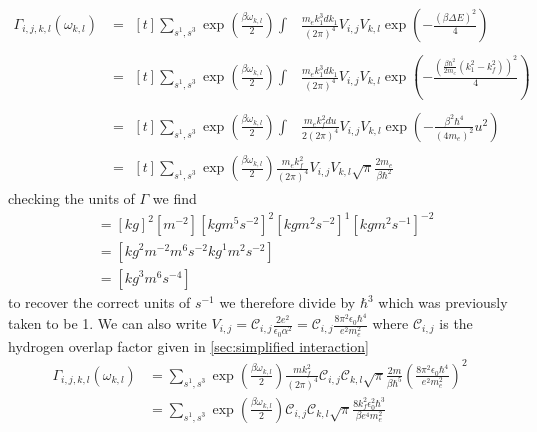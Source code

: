 \begin{align}
    \Gamma_{i,j, k,l}(\omega_{k,l}) & =\begin{aligned}[t]
        \sum_{s^1,s^3} \exp{(\frac{\beta \omega_{k,l}}{2})} \int &
        \frac{m_e k_1^3 dk_1}{{(2\pi)}^4}
        V_{i,j} V_{k,l} \exp{(- \frac{{(\beta \Delta E)}^2}{4})}
    \end{aligned} \\
                                    & =\begin{aligned}[t]
        \sum_{s^1,s^3} \exp{(\frac{\beta \omega_{k,l}}{2})} \int &
        \frac{m_e k_1^3 dk_1}{{(2\pi)}^4}
        V_{i,j} V_{k,l} \exp{(- \frac{{(\frac{\beta \hbar^2}{2 m_e}(k_1^2 - k_f^2))}^2}{4})}
    \end{aligned} \\
                                    & =\begin{aligned}[t]
        \sum_{s^1,s^3} \exp{(\frac{\beta \omega_{k,l}}{2})} \int &
        \frac{m_e k_f^2 du}{2{(2\pi)}^4}
        V_{i,j} V_{k,l} \exp{(- \frac{\beta^2 \hbar^4}{{(4m_e)}^2} u^2)}
    \end{aligned} \\
                                    & =\begin{aligned}[t]
        \sum_{s^1,s^3} \exp{(\frac{\beta \omega_{k,l}}{2})} \frac{m_e k_f^2 }{{(2\pi)}^4}
        V_{i,j} V_{k,l} \sqrt{\pi} \frac{2m_e}{\beta \hbar^2}
    \end{aligned}
\end{align}
checking the units of \(\Gamma \) we find
\begin{align}
    [\Gamma] & = {[kg]}^2[m^{-2}]{[kgm^5s^{-2}]}^2{[kgm^2s^{-2}]}^{1}{[kg m^2 s^{-1}]}^{-2} \\
             & = [{kg}^2 m^{-2} m^{6} s^{-2} {kg}^{1} m^{2} s^{-2}]                         \\
             & = [{kg}^3 m^{6}s^{-4}]
\end{align}
to recover the correct units of \(s^{-1}\) we
therefore divide by \(\hbar^3 \) which was previously
taken to be 1. We can also write
\(V_{i,j}
= \mathcal{C}_{i,j} \frac{2e^2}{\epsilon_0 \alpha^2}
= \mathcal{C}_{i,j} \frac{8 \pi^2 \epsilon_0 \hbar^4}{e^2 m_e^2}\)
where \(\mathcal{C}_{i,j}\) is the hydrogen
overlap factor given in \cref{sec:simplified interaction}
\begin{align}
    \Gamma_{i,j, k,l}(\omega_{k,l}) & =
    \sum_{s^1,s^3} \exp{(\frac{\beta \omega_{k,l}}{2})}
    \frac{m k_f^2 }{{(2\pi)}^4}
    \mathcal{C}_{i,j} \mathcal{C}_{k,l}
    \sqrt{\pi} \frac{2m}{\beta \hbar^5} {(\frac{8 \pi^2 \epsilon_0 \hbar^4}{e^2 m_e^2})}^2 \\
                                    & =
    \sum_{s^1,s^3} \exp{(\frac{\beta \omega_{k,l}}{2})}
    \mathcal{C}_{i,j} \mathcal{C}_{k,l}
    \sqrt{\pi} \frac{8 k_f^2 \epsilon_0^2 \hbar^3}{\beta e^4 m_e^2}
\end{align}

